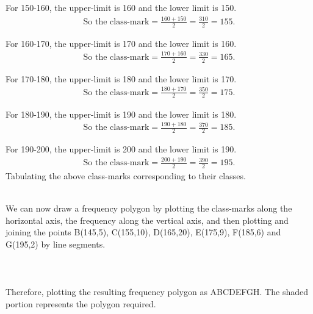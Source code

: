 \documentclass[journal,12pt,twocolumn]{IEEEtran}
\begin{document}
	\item For 150-160, the upper-limit is 160 and the lower limit is 150.
	\begin{align*}
	\text{So the class-mark}=\frac{160+150}{2}=\frac{310}{2}=155.
	\end{align*}
	\item For 160-170, the upper-limit is 170 and the lower limit is 160.
	\begin{align*}
	\text{So the class-mark}=\frac{170+160}{2}=\frac{330}{2}=165.
	\end{align*}
	\item For 170-180, the upper-limit is 180 and the lower limit is 170.
	\begin{align*}
	\text{So the class-mark}=\frac{180+170}{2}=\frac{350}{2}=175.
	\end{align*}
	\item For 180-190, the upper-limit is 190 and the lower limit is 180.
	\begin{align*}
	\text{So the class-mark}=\frac{190+180}{2}=\frac{370}{2}=185.
	\end{align*}
	\item For 190-200, the upper-limit is 200 and the lower limit is 190.
	\begin{align*}
	\text{So the class-mark}=\frac{200+190}{2}=\frac{390}{2}=195.
	\end{align*}
	Tabulating the above class-marks corresponding to their classes.
	\begin{table}[!htb]

\end{table}\\
We can now draw a frequency polygon by plotting the class-marks along the horizontal axis, the frequency along the vertical axis, and then plotting and joining the points B(145,5), C(155,10), D(165,20), E(175,9), F(185,6) and G(195,2) by line segments.\\
\\
\\
\\
Therefore, plotting the resulting frequency polygon as ABCDEFGH. The shaded portion represents the polygon required.
\end{document}
